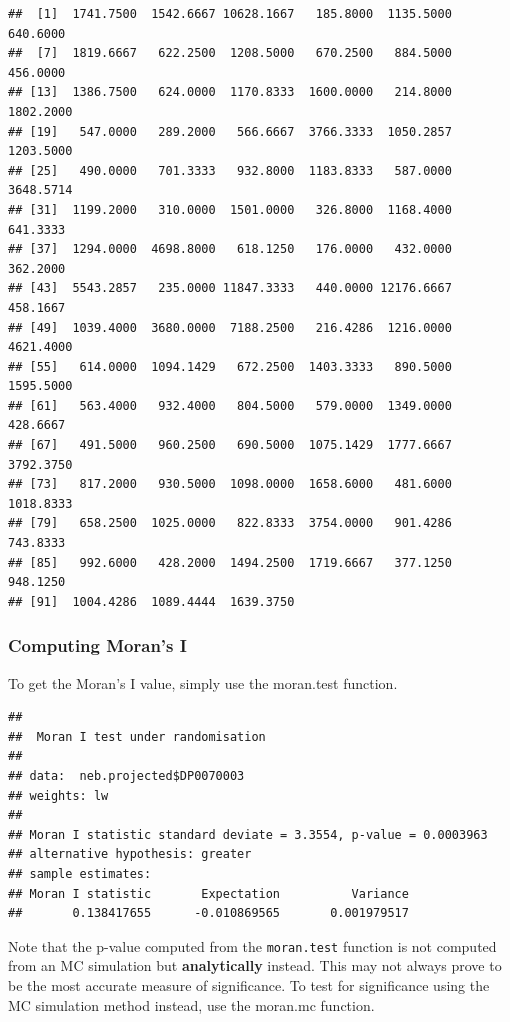 \documentclass[]{article}
\newenvironment{Shaded}{\begin{snugshade}}{\end{snugshade}}
\newcommand{\FunctionTok}[1]{\textcolor[rgb]{0.00,0.00,0.00}{#1}}
\newcommand{\NormalTok}[1]{#1}
\newcommand{\SpecialCharTok}[1]{\textcolor[rgb]{0.00,0.00,0.00}{#1}}
\begin{document}
\begin{verbatim}
##  [1]  1741.7500  1542.6667 10628.1667   185.8000  1135.5000   640.6000
##  [7]  1819.6667   622.2500  1208.5000   670.2500   884.5000   456.0000
## [13]  1386.7500   624.0000  1170.8333  1600.0000   214.8000  1802.2000
## [19]   547.0000   289.2000   566.6667  3766.3333  1050.2857  1203.5000
## [25]   490.0000   701.3333   932.8000  1183.8333   587.0000  3648.5714
## [31]  1199.2000   310.0000  1501.0000   326.8000  1168.4000   641.3333
## [37]  1294.0000  4698.8000   618.1250   176.0000   432.0000   362.2000
## [43]  5543.2857   235.0000 11847.3333   440.0000 12176.6667   458.1667
## [49]  1039.4000  3680.0000  7188.2500   216.4286  1216.0000  4621.4000
## [55]   614.0000  1094.1429   672.2500  1403.3333   890.5000  1595.5000
## [61]   563.4000   932.4000   804.5000   579.0000  1349.0000   428.6667
## [67]   491.5000   960.2500   690.5000  1075.1429  1777.6667  3792.3750
## [73]   817.2000   930.5000  1098.0000  1658.6000   481.6000  1018.8333
## [79]   658.2500  1025.0000   822.8333  3754.0000   901.4286   743.8333
## [85]   992.6000   428.2000  1494.2500  1719.6667   377.1250   948.1250
## [91]  1004.4286  1089.4444  1639.3750
\end{verbatim}

\hypertarget{computing-morans-i}{%
\subsubsection{Computing Moran's I}\label{computing-morans-i}}

To get the Moran's I value, simply use the moran.test function.

\begin{Shaded}
\end{Shaded}

\begin{verbatim}
## 
##  Moran I test under randomisation
## 
## data:  neb.projected$DP0070003  
## weights: lw    
## 
## Moran I statistic standard deviate = 3.3554, p-value = 0.0003963
## alternative hypothesis: greater
## sample estimates:
## Moran I statistic       Expectation          Variance 
##       0.138417655      -0.010869565       0.001979517
\end{verbatim}

Note that the p-value computed from the \texttt{moran.test} function is
not computed from an MC simulation but \textbf{analytically} instead.
This may not always prove to be the most accurate measure of
significance. To test for significance using the MC simulation method
instead, use the moran.mc function.
\end{document}
